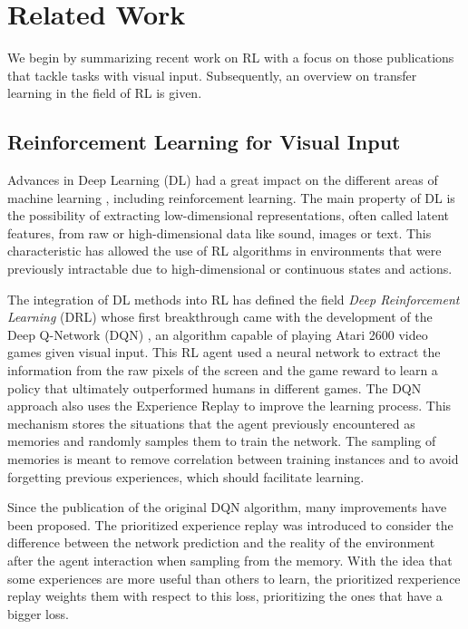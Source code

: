 \section{Related Work}
\label{sec:related-work}
We begin by summarizing recent work on RL with a focus on those publications that tackle tasks with visual input. Subsequently, an overview on transfer learning in the field of RL is given. 

\subsection{Reinforcement Learning for Visual Input}
Advances in Deep Learning (DL) had a great impact on the different areas of machine learning \citep{deep_learning_development}, including reinforcement learning. The main property of DL is the possibility of extracting low-dimensional representations, often called latent features, from raw or high-dimensional data like sound, images or text. This characteristic has allowed the use of RL algorithms in environments that were previously intractable due to high-dimensional or continuous states and actions.

The integration of DL methods into RL has defined the field \textit{Deep Reinforcement Learning} (DRL) whose first breakthrough came with the development of the Deep Q-Network (DQN) \citep{DQN}, an algorithm capable of playing Atari 2600 video games given visual input. This RL agent used a neural network to extract the information from the raw pixels of the screen and the game reward to learn a policy that ultimately outperformed humans in different games. The DQN approach also uses the Experience Replay \citep{replay_memory_oc} to improve the learning process. This mechanism stores the situations that the agent previously encountered as memories and randomly samples them to train the network. The sampling of memories is meant to remove correlation between training instances and to avoid forgetting previous experiences, which should facilitate learning.

Since the publication of the original DQN algorithm, many improvements have been proposed. The prioritized experience replay \citep{prioritized_memory} was introduced to consider the difference between the network prediction and the reality of the environment after the agent interaction when sampling from the memory. With the idea that some experiences are more useful than others to learn, the prioritized rexperience replay weights them with respect to this loss, prioritizing the ones that have a bigger loss.

